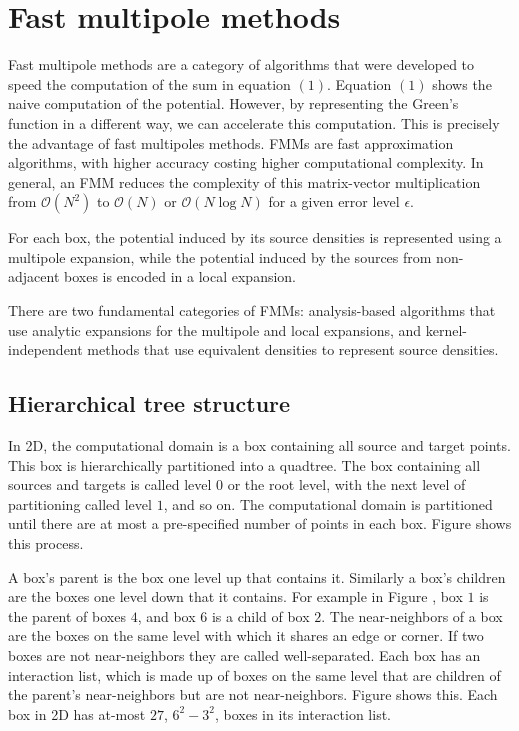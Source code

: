 \documentclass[11pt, oneside]{article}   	%
\begin{document}
\section{Fast multipole methods}
Fast multipole methods are a category of algorithms that were developed to speed the computation of the sum in equation $(1)$. Equation $(1)$ shows the naive computation of the potential. However, by representing the Green's function in a different way, we can accelerate this computation. This is precisely the advantage of fast multipoles methods. FMMs are fast approximation algorithms, with higher accuracy costing higher computational complexity. In general, an FMM reduces the complexity of this matrix-vector multiplication from $\mathcal{O}(N^2)$ to $\mathcal{O}(N)$ or $\mathcal{O}(N\log N)$ for a given error level $\epsilon$.

For each box, the potential induced by its source densities is represented using a multipole expansion, while the potential induced by the sources from non-adjacent boxes is encoded in a local expansion.

There are two fundamental categories of FMMs: analysis-based algorithms that use analytic expansions for the multipole and local expansions, and kernel-independent methods that use equivalent densities to represent source densities.

\subsection{Hierarchical tree structure}
In 2D, the computational domain is a box containing all source and target points. This box is hierarchically partitioned into a quadtree. The box containing all sources and targets is called level $0$ or the root level, with the next level of partitioning called level $1$, and so on. The computational domain is partitioned until there are at most a pre-specified number of points in each box. Figure shows this process.

A box's parent is the box one level up that contains it. Similarly a box's children are the boxes one level down that it contains. For example in Figure , box $1$ is the parent of boxes $4$, and box $6$ is a child of box $2$. The near-neighbors of a box are the boxes on the same level with which it shares an edge or corner. If two boxes are not near-neighbors they are called well-separated. Each box has an interaction list, which is made up of boxes on the same level that are children of the parent's near-neighbors but are not near-neighbors. Figure shows this. Each box in 2D has at-most $27$, $6^2-3^2$, boxes in its interaction list.
\end{document}
